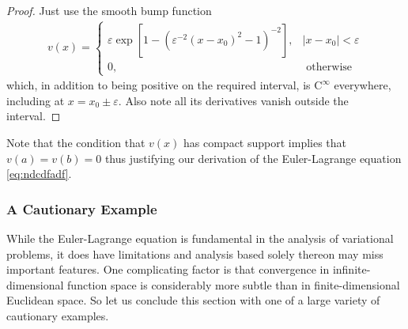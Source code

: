 \documentclass{article}
\begin{document}
\begin{proof}
Just use the smooth bump function
\begin{align*}
v(x)= \begin{cases}\varepsilon \exp \left[1-\left(\varepsilon^{-2}\left(x-x_{0}\right)^{2}-1\right)^{-2}\right], & \left|x-x_{0}\right|<\varepsilon \\ 0, & \text { otherwise }\end{cases}
\end{align*}
which, in addition to being positive on the required interval, is $\mathrm{C}^{\infty}$ everywhere, including at $x=x_{0} \pm \varepsilon$. Also note all its derivatives vanish outside the interval.
\end{proof}
Note that the condition that $v(x)$ has compact support implies that $v(a)=v(b)=0$ thus justifying our derivation of the Euler-Lagrange equation \cref{eq:ndcdfadf}.
\subsubsection{A Cautionary Example}
While the Euler-Lagrange equation is fundamental in the analysis of variational problems, it does have limitations and analysis based solely thereon may miss important features. One complicating factor is that convergence in infinite-dimensional function space is considerably more subtle than in finite-dimensional Euclidean space. So let us conclude this section with one of a large variety of cautionary examples.
\end{document}
